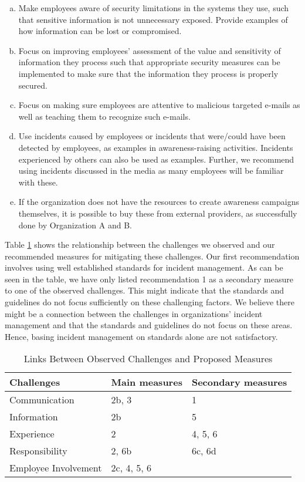 \begin{enumerate}
\begin{enumerate}[a)]
\item Make employees aware of security limitations in the systems they use, such that sensitive information is not unnecessary exposed. Provide examples of how information can be lost or compromised.
\item Focus on improving employees' assessment of the value and sensitivity of information they process such that appropriate security measures can be implemented to make sure that the information they process is properly secured. 
\item Focus on making sure employees are attentive to malicious targeted e-mails as well as teaching them to recognize such e-mails.
\item Use incidents caused by employees or incidents that were/could have been detected by employees, as examples in awareness-raising activities. Incidents experienced by others can also be used as examples. Further, we recommend using incidents discussed in the media as many employees will be familiar with these. 
\item If the organization does not have the resources to create awareness campaigns themselves, it is possible to buy these from external providers, as successfully done by Organization A and B.
\end{enumerate}
\end{enumerate}

Table \ref{tab:challengesAndMeasures} shows the relationship between the challenges we observed and our recommended measures for mitigating these challenges. Our first recommendation involves using well established standards for incident management. As can be seen in the table, we have only listed recommendation 1 as a secondary measure to one of the observed challenges. This might indicate that the standards and guidelines do not focus sufficiently on these challenging factors. We believe there might be a connection between the challenges in organizations' incident management and that the standards and guidelines do not focus on these areas. Hence, basing incident management on standards alone are not satisfactory.

\begin{table}[H]
\begin{center}
\begin{tabular}{| l | l | l |}
\hline
  \textbf{Challenges} & \textbf{Main measures} & \textbf{Secondary measures} \\
  \hline
  Communication & 2b, 3 & 1 \\
  \hline
  Information & 2b & 5 \\
  \hline
  Experience & 2 & 4, 5, 6 \\
  \hline
  Responsibility & 2, 6b & 6c, 6d \\
  \hline
  Employee Involvement & 2c, 4, 5, 6 &  \\
\hline
\end{tabular}
\caption{Links Between Observed Challenges and Proposed Measures}
\label{tab:challengesAndMeasures}
\end{center}
\end{table}

